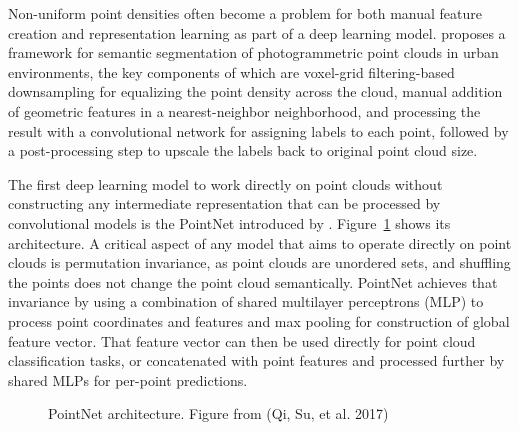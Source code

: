 Non-uniform point densities often become a problem for both manual feature creation and representation learning as part of a deep learning model.
\citet{ozdemirDeepLearningFramework2021} proposes a framework for semantic segmentation of photogrammetric point clouds in urban environments, the key components of which are voxel-grid filtering-based downsampling for equalizing the point density across the cloud, manual addition of geometric features in a nearest-neighbor neighborhood, and processing the result with a convolutional network for assigning labels to each point, followed by a post-processing step to upscale the labels back to original point cloud size.

The first deep learning model to work directly on point clouds without constructing any intermediate representation that can be processed by convolutional models is the PointNet introduced by \citet{qiPointNet2017}.
Figure~\ref{fig-pointnet-architecture} shows its architecture.
A critical aspect of any model that aims to operate directly on point clouds is permutation invariance, as point clouds are unordered sets, and shuffling the points does not change the point cloud semantically.
PointNet achieves that invariance by using a combination of shared multilayer perceptrons (MLP) to process point coordinates and features and max pooling for construction of global feature vector.
That feature vector can then be used directly for point cloud classification tasks, or concatenated with point features and processed further by shared MLPs for per-point predictions.

\begin{figure}
\caption{\label{fig-pointnet-architecture}PointNet architecture. Figure
from (Qi, Su, et al. 2017)}
\end{figure}

